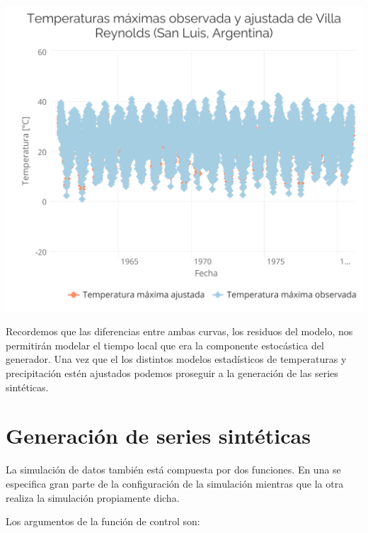 \documentclass[
]{article}
\begin{document}
\begin{center}\includegraphics{Webinario_Generador_files/figure-latex/unnamed-chunk-17-1} \end{center}

Recordemos que las diferencias entre ambas curvas, los residuos del modelo, nos permitirán modelar el tiempo local que era la componente estocástica del generador.
Una vez que el los distintos modelos estadísticos de temperaturas y precipitación estén ajustados podemos proseguir a la generación de las series sintéticas.

\hypertarget{generaciuxf3n-de-series-sintuxe9ticas}{%
\section{Generación de series sintéticas}\label{generaciuxf3n-de-series-sintuxe9ticas}}

La simulación de datos también está compuesta por dos funciones. En una se especifica gran parte de la configuración de la simulación mientras que la otra realiza la simulación propiamente dicha.

Los argumentos de la función de control son:
\end{document}
